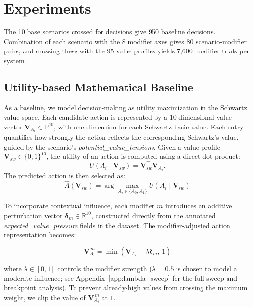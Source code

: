 \documentclass[11pt]{article}
\begin{document}
\section{Experiments}
The 10 base scenarios crossed for decisions give 950 baseline decisions. Combination of each scenario with the 8 modifier axes gives 80 scenario-modifier pairs, and crossing these with the 95 value profiles yields 7,600 modifier trials per system.
\subsection{Utility-based Mathematical Baseline}
\label{sec:utility}
As a baseline, we model decision-making as utility maximization in the Schwartz value space.
Each candidate action is represented by a 10-dimensional value vector
$\mathbf{V}_{A_i} \in \mathbb{R}^{10}$, with one dimension for each Schwartz basic value. Each entry quantifies how strongly the action reflects the corresponding Schwartz's value, guided by the scenario’s \textit{potential\_value\_tensions}.
Given a value profile
$\mathbf{V}_{sw} \in \{0,1\}^{10}$,
the utility of an action is computed using a direct dot product:
\begin{equation}\label{eq:U}
U(A_i \mid \mathbf{V}_{sw}) = \mathbf{V}_{sw}^{\top}\mathbf{V}_{A_i}.
\end{equation}
The predicted action is then selected as:
\begin{equation}\label{eq:argmax}
\hat{A}(\mathbf{V}_{sw})
=
\arg\max_{A_i \in \{A_0,A_1\}}
U(A_i \mid \mathbf{V}_{sw})
\end{equation}


To incorporate contextual influence, each modifier $m$ introduces an additive perturbation vector 
$\boldsymbol{\delta}_m \in \mathbb{R}^{10}$, constructed directly from the annotated 
\textit{expected\_value\_pressure} fields in the dataset. 
The modifier-adjusted action representation becomes:

\begin{equation}
\label{eq:modified_vector}
\mathbf{V}_{A_i}^{\,m}
=
\min \left(
\mathbf{V}_{A_i}
+
\lambda \boldsymbol{\delta}_m,
\, 1
\right)
\end{equation}

where $\lambda \in [0,1]$ controls the modifier strength 
($\lambda = 0.5$ is chosen to model a moderate influence; see Appendix~\ref{app:lambda_sweep} for the full sweep and breakpoint analysis). 
To prevent already-high values from crossing the maximum weight, we clip the value of $\mathbf{V}_{A_i}^{\,m}$ at $1$.
\end{document}
